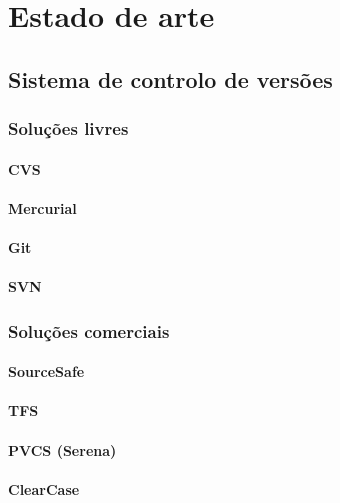 



\chapter{Estado de arte}





\section{Sistema de controlo de versões}

\subsection{Soluções livres}

\subsubsection{CVS}


\subsubsection{Mercurial}


\subsubsection{Git}


\subsubsection{SVN}



\subsection{Soluções comerciais}

\subsubsection{SourceSafe}
\subsubsection{TFS}
\subsubsection{PVCS (Serena)}
\subsubsection{ClearCase}



